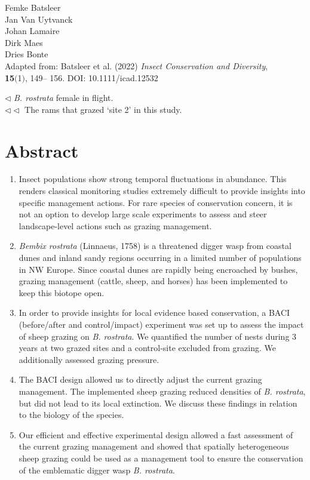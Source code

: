 \documentclass[10pt, twoside]{book} %
\begin{document}
		\begin{flushright} \color{gray}Femke Batsleer\\ Jan Van Uytvanck\\ Johan Lamaire\\ Dirk Maes\\ Dries Bonte\\
	
	 
	\vspace*{2cm}
	Adapted from: Batsleer et al. (2022) \textit{Insect Conservation and Diversity},\\ \textbf{15}$($1$)$, 149– 156. DOI: 10.1111/icad.12532
	\vspace*{\fill}
\end{flushright}
\noindent \color{gray} $\lhd$ \textit{B. rostrata} female in flight.\\
\noindent  $\lhd\lhd$ The rams that grazed `site 2' in this study.	

	\color{black}
	\newpage
	
	
	\section{Abstract}
	\begin{enumerate}
		\item Insect populations show strong temporal fluctuations in abundance. This renders classical monitoring studies extremely difficult to provide insights into specific management actions. For rare species of conservation concern, it is not an option to develop large scale experiments to assess and steer landscape-level actions such as grazing management.
		
		\item \textit{Bembix rostrata} (Linnaeus, 1758) is a threatened digger wasp from coastal dunes and inland sandy regions occurring in a limited number of populations in NW Europe. Since coastal dunes are rapidly being encroached by bushes, grazing management (cattle, sheep, and horses) has been implemented to keep this biotope open.
		
		\item In order to provide insights for local evidence based conservation, a BACI (before/after and control/impact) experiment was set up to assess the impact of sheep grazing on \textit{B. rostrata}. We quantified the number of nests during 3 years at two grazed sites and a control-site excluded from grazing. We additionally assessed grazing pressure.
		
		\item The BACI design allowed us to directly adjust the current grazing management. The implemented sheep grazing reduced densities of \textit{B. rostrata}, but did not lead to its local extinction. We discuss these findings in relation to the biology of the species.
		
		\item Our efficient and effective experimental design allowed a fast assessment of the current grazing management and showed that spatially heterogeneous sheep grazing could be used as a management tool to ensure the conservation of the emblematic digger wasp \textit{B. rostrata}.
		
	\end{enumerate}
\end{document}
